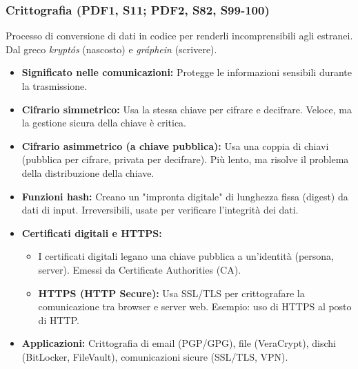 \documentclass{beamer}
\begin{document}
\begin{frame}
  \frametitle{Crittografia (PDF1, S11; PDF2, S82, S99-100)}
  Processo di conversione di dati in codice per renderli incomprensibili agli estranei. Dal greco \textit{kryptós} (nascosto) e \textit{gráphein} (scrivere).
  \begin{itemize}
    \item \textbf{Significato nelle comunicazioni:} Protegge le informazioni sensibili durante la trasmissione.
    \item \textbf{Cifrario simmetrico:} Usa la stessa chiave per cifrare e decifrare. Veloce, ma la gestione sicura della chiave è critica.
    \item \textbf{Cifrario asimmetrico (a chiave pubblica):} Usa una coppia di chiavi (pubblica per cifrare, privata per decifrare). Più lento, ma risolve il problema della distribuzione della chiave.
    \item \textbf{Funzioni hash:} Creano un "impronta digitale" di lunghezza fissa (digest) da dati di input. Irreversibili, usate per verificare l'integrità dei dati.
    \item \textbf{Certificati digitali e HTTPS:}
    \begin{itemize}
        \item I certificati digitali legano una chiave pubblica a un'identità (persona, server). Emessi da Certificate Authorities (CA).
        \item \textbf{HTTPS (HTTP Secure):} Usa SSL/TLS per crittografare la comunicazione tra browser e server web. Esempio: uso di HTTPS al posto di HTTP.
    \end{itemize}
    \item \textbf{Applicazioni:} Crittografia di email (PGP/GPG), file (VeraCrypt), dischi (BitLocker, FileVault), comunicazioni sicure (SSL/TLS, VPN).
  \end{itemize}
\end{frame}
\end{document}

